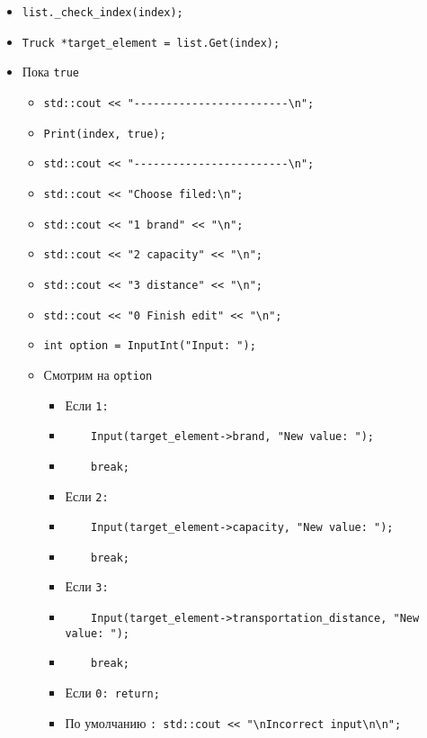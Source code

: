 \begin{itemize}
    \item \verb|list._check_index(index);|
    \item \verb|Truck *target_element = list.Get(index);|
    \item Пока \verb|true|
        \begin{itemize}
            \item \verb|std::cout << "------------------------\n";|
            \item \verb|Print(index, true);|
            \item \verb|std::cout << "------------------------\n";|
            \item \verb|std::cout << "Choose filed:\n";|
            \item \verb|std::cout << "1 brand" << "\n";|
            \item \verb|std::cout << "2 capacity" << "\n";|
            \item \verb|std::cout << "3 distance" << "\n";|
            \item \verb|std::cout << "0 Finish edit" << "\n";|
            \item \verb|int option = InputInt("Input: ");|
            \item Смотрим на \verb|option|
            \begin{itemize}
                \item Если \verb|1:|
                \item \verb|    Input(target_element->brand, "New value: ");|
                \item \verb|    break;|
                \item Если \verb|2:|
                \item \verb|    Input(target_element->capacity, "New value: ");|
                \item \verb|    break;|
                \item Если \verb|3:|
                \item \verb|    Input(target_element->transportation_distance, "New value: ");|
                \item \verb|    break;|
                \item Если \verb|0: return;|
                \item По умолчанию \verb|: std::cout << "\nIncorrect input\n\n";|
            \end{itemize}
        \end{itemize}
\end{itemize}



